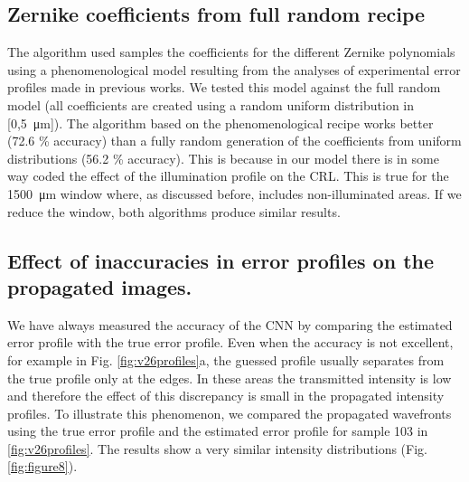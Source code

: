 \documentclass[preprint]{iucr}
\newcommand{\inred}[1]{{\color{red}#1}}
\begin{document}
\subsection{Zernike coefficients from full random recipe}
The algorithm used samples the coefficients for the different Zernike polynomials using a phenomenological model resulting from the analyses of experimental error profiles made in previous works. We tested this model against the full random model (all  coefficients are created using a random uniform distribution in [0,\SI{5}{\micro\meter}]). The algorithm based on the phenomenological recipe works better (\inred{72.6 \%} accuracy) than a fully random generation of the coefficients from uniform distributions (\inred{56.2 \%} accuracy). This is because in our model there is in some way coded the effect of the illumination profile on the CRL. This is true for the \SI{1500}{\micro\meter} window where, as discussed before, includes non-illuminated areas. If we reduce the window, both algorithms produce similar results. 

\subsection{Effect of inaccuracies in error profiles on the propagated images.}
We have always measured the accuracy of the CNN by comparing the \inred{estimated} error profile with the true error profile. Even when the accuracy is not excellent, for example in Fig. \ref{fig:v26profiles}a, the guessed profile usually separates from the true profile only at the edges. In these areas the transmitted intensity is low and therefore the effect of this discrepancy is small in the propagated intensity profiles. To illustrate this phenomenon, we compared the propagated wavefronts using the true error profile and the \inred{estimated} error profile for sample 103 in \ref{fig:v26profiles}. The results show a very similar intensity distributions (Fig. \ref{fig:figure8}).
\end{document}

